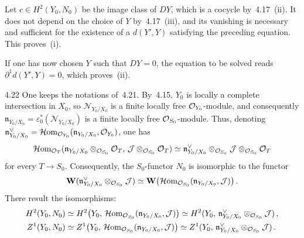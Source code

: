 Let \(c\in H^{2}(Y_{0},N_{0})\) be the image class of \(DY\), which is a
cocycle by~4.17~(ii). It does not depend on the choice of \(Y\) by~4.17~(iii),
and its vanishing is necessary and sufficient for the existence of a
\(d(Y',Y)\) satisfying the preceding equation. This proves~(i).

If one has now chosen \(Y\) such that \(DY=0\), the equation to be solved
reads \(\partial^{1}d(Y',Y)=0\), which proves~(ii).

\begin{remark}{4.22}\label{III.4.22}
One keeps the notations of~4.21. By~4.15, \(Y_{0}\) is locally a complete
intersection in \(X_{0}\), so \(\mathcal{N}_{Y_{0}/X_{0}}\) is a finite
locally free \(\mathcal{O}_{Y_{0}}\)-module, and consequently
\(\mathfrak{n}_{Y_{0}/X_{0}}=\varepsilon_{0}^{*}(\mathcal{N}_{Y_{0}/X_{0}})\)
is a finite locally free \(\mathcal{O}_{S_{0}}\)-module. Thus, denoting
\(\mathfrak{n}^{\vee}_{Y_{0}/X_{0}}
=\mathcal{H}\mathrm{om}_{\mathcal{O}_{Y_{0}}}(\mathfrak{n}_{Y_{0}/X_{0}},\mathcal{O}_{Y_{0}})\),
one has
\[
\mathcal{H}\mathrm{om}_{\mathcal{O}_{T}}
  (\mathfrak{n}_{Y_{0}/X_{0}}\otimes_{\mathcal{O}_{S_{0}}}\mathcal{O}_{T},\,
   \mathcal{J}\otimes_{\mathcal{O}_{S_{0}}}\mathcal{O}_{T})
\simeq
\mathfrak{n}^{\vee}_{Y_{0}/X_{0}}\otimes_{\mathcal{O}_{S_{0}}}\mathcal{J}
  \otimes_{\mathcal{O}_{S_{0}}}\mathcal{O}_{T}
\]
for every \(T\to S_{0}\).%
{\renewcommand{\thefootnote}{(119)}}
Consequently, the \(S_{0}\)-functor \(N_{0}\) is isomorphic to the functor
\[
\mathbf{W}(\mathfrak{n}^{\vee}_{Y_{0}/X_{0}}\otimes_{\mathcal{O}_{S_{0}}}\mathcal{J})
\simeq
\mathbf{W}\bigl(\mathcal{H}\mathrm{om}_{\mathcal{O}_{S_{0}}}
  (\mathfrak{n}_{Y_{0}/X_{0}},\mathcal{J})\bigr)\,.
\]
There result the isomorphisms:%
{\renewcommand{\thefootnote}{(120)}}
\begin{align*}
H^{2}(Y_{0},N_{0})
&\simeq
H^{2}\bigl(Y_{0},\,
  \mathcal{H}\mathrm{om}_{\mathcal{O}_{S_{0}}}(\mathfrak{n}_{Y_{0}/X_{0}},\mathcal{J})\bigr)
\simeq
H^{2}(Y_{0},\,\mathfrak{n}^{\vee}_{Y_{0}/X_{0}}\otimes_{\mathcal{O}_{S_{0}}}\mathcal{J})\,,
\\
Z^{1}(Y_{0},N_{0})
&\simeq
Z^{1}\bigl(Y_{0},\,
  \mathcal{H}\mathrm{om}_{\mathcal{O}_{S_{0}}}(\mathfrak{n}_{Y_{0}/X_{0}},\mathcal{J})\bigr)
\simeq
Z^{1}(Y_{0},\,\mathfrak{n}^{\vee}_{Y_{0}/X_{0}}\otimes_{\mathcal{O}_{S_{0}}}\mathcal{J})\,.
\end{align*}
\end{remark}

